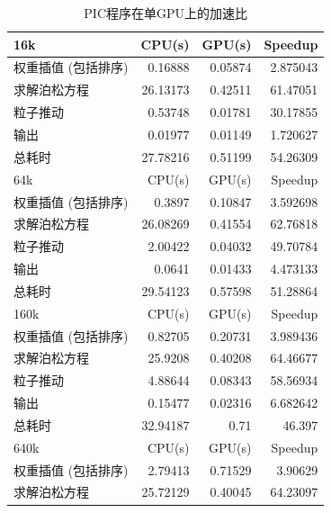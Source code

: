 \begin{table}
  \centering
  \caption{PIC程序在单GPU上的加速比}
  \begin{tabular}{|l|r|r|r|}
    \hline
    16k                      &    CPU(s)      &     GPU(s)    &  Speedup    \\
    \hline
    权重插值 (包括排序) &    0.16888     &     0.05874   &  2.875043   \\
    求解泊松方程           &    26.13173    &     0.42511   &  61.47051   \\
    粒子推动            &    0.53748	  &     0.01781	  &  30.17855   \\
    输出                   &    0.01977     &     0.01149   &  1.720627   \\
    总耗时               &    27.78216    &     0.51199   &  54.26309   \\
    \hline
    64k                      &    CPU(s)      &     GPU(s)    &  Speedup    \\
    \hline
    权重插值 (包括排序) &    0.3897      &     0.10847   &  3.592698   \\
    求解泊松方程           &    26.08269    &     0.41554   &  62.76818   \\
    粒子推动            &    2.00422	  &     0.04032	  &  49.70784   \\
    输出                   &    0.0641      &     0.01433   &  4.473133   \\
    总耗时               &    29.54123    &     0.57598   &  51.28864   \\
    \hline
    160k                     &    CPU(s)      &     GPU(s)    &  Speedup    \\
    \hline
    权重插值 (包括排序) &    0.82705     &     0.20731   &  3.989436   \\
    求解泊松方程           &    25.9208     &     0.40208   &  64.46677   \\
    粒子推动            &    4.88644	  &     0.08343	  &  58.56934   \\
    输出                   &    0.15477     &     0.02316   &  6.682642   \\
    总耗时               &    32.94187    &     0.71      &  46.397     \\
    \hline
    640k                     &    CPU(s)      &     GPU(s)    &  Speedup    \\
    \hline
    权重插值 (包括排序) &    2.79413     &     0.71529   &  3.90629    \\
    求解泊松方程           &    25.72129    &     0.40045   &  64.23097   \\

\end{tabular}
\end{table}
